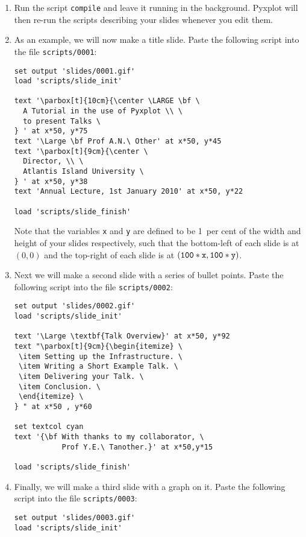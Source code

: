 \begin{enumerate}
\item Run the script {\tt compile} and leave it running in the background.
Pyxplot will then re-run the scripts describing your slides whenever you edit
them.
\item As an example, we will now make a title slide. Paste the following script
into the file {\tt scripts/0001}:
\begin{verbatim}
set output 'slides/0001.gif'
load 'scripts/slide_init'

text '\parbox[t]{10cm}{\center \LARGE \bf \
  A Tutorial in the use of Pyxplot \\ \
  to present Talks \
} ' at x*50, y*75
text '\Large \bf Prof A.N.\ Other' at x*50, y*45
text '\parbox[t]{9cm}{\center \
  Director, \\ \
  Atlantis Island University \
} ' at x*50, y*38
text 'Annual Lecture, 1st January 2010' at x*50, y*22

load 'scripts/slide_finish'
\end{verbatim}
Note that the variables {\tt x} and {\tt y} are defined to be 1~per cent of the
width and height of your slides respectively, such that the bottom-left of each
slide is at $(0,0)$ and the top-right of each slide is at $({\tt 100*x},{\tt
100*y})$.
\item Next we will make a second slide with a series of bullet points. Paste
the following script into the file {\tt scripts/0002}:
\begin{verbatim}
set output 'slides/0002.gif'
load 'scripts/slide_init'

text '\Large \textbf{Talk Overview}' at x*50, y*92
text "\parbox[t]{9cm}{\begin{itemize} \
 \item Setting up the Infrastructure. \
 \item Writing a Short Example Talk. \
 \item Delivering your Talk. \
 \item Conclusion. \
 \end{itemize} \
} " at x*50 , y*60

set textcol cyan
text '{\bf With thanks to my collaborator, \
           Prof Y.E.\ Tanother.}' at x*50,y*15

load 'scripts/slide_finish'
\end{verbatim}
\item Finally, we will make a third slide with a graph on it. Paste the
following script into the file {\tt scripts/0003}:
\begin{verbatim}
set output 'slides/0003.gif'
load 'scripts/slide_init'


\end{verbatim}
\end{enumerate}
